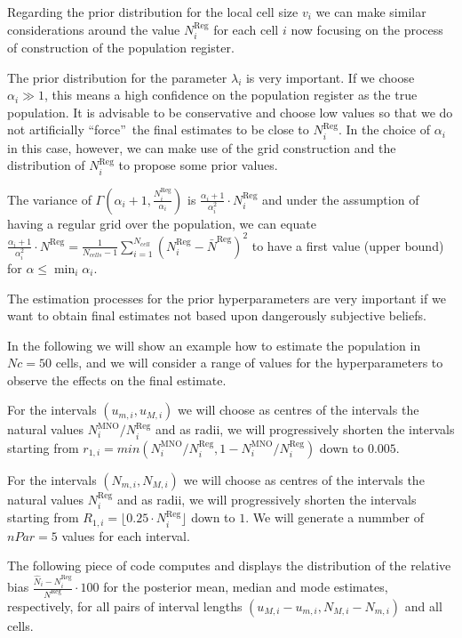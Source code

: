 \documentclass[12pt, a4paper]{article}
\begin{document}
Regarding the prior distribution for the local cell size $v_{i}$ we can make similar 
considerations around the value $N_{i}^{\textrm{Reg}}$ for each cell $i$ now focusing on the 
process of construction of the population register.

The prior distribution for the parameter $\lambda_{i}$ is very important. 
If we choose $\alpha_{i}\gg 1$, this means a high confidence on 
the population register as the true population. It is advisable to be conservative 
and choose low values so that we do not artificially  \textquotedblleft force\textquotedblright\ 
the final estimates to be close to $N_{i}^{\textrm{Reg}}$. In the choice of $\alpha_{i}$ in this case, 
however, we can make use of the grid construction and the distribution 
of $N_{i}^{\textrm{Reg}}$ to propose some prior values. 

The variance of $\Gamma(\alpha_{i} + 1, \frac{N^{\textrm{Reg}}_{i}}{\alpha_{i}})$ 
is $\frac{\alpha_{i} + 1}{\alpha_{i}^{2}}\cdot N^{\textrm{Reg}}_{i}$ and under the 
assumption of having a regular grid over the population, we can equate 
$\frac{\alpha_{i} + 1}{\alpha_{i}^{2}}\cdot N^{\textrm{Reg}}=\frac{1}{N_{cells} - 1}\sum_{i=1}^{N_{cell}}\left(N_{i}^{\textrm{Reg}} - \bar{N}^{\textrm{Reg}}\right)^{2}$
to have a first value (upper bound) for $\alpha\leq\min_{i}\alpha_{i}$. 

The estimation processes for the prior hyperparameters are very important if we want to obtain final estimates 
not based upon dangerously subjective beliefs.

In the following we will show an example how to estimate the population in $Nc=50$ cells, 
and we will consider a range of values for the hyperparameters to observe the effects on the final estimate.

For the intervals $(u_{m,i}, u_{M,i})$ we will choose as centres of the intervals the 
natural values $N^{\textrm{MNO}}_{i} / N^{\textrm{Reg}}_{i}$ and as radii, we will progressively 
shorten the intervals starting from $r_{1,i}=min(N^{\textrm{MNO}}_{i} / N^{\textrm{Reg}}_{i}, 1- N^{\textrm{MNO}}_{i} / N^{\textrm{Reg}}_{i})$ down to $0.005$.

For the intervals $(N_{m,i}, N_{M,i})$ we will choose as centres of the intervals the natural 
values $N^{\textrm{Reg}}_{i}$ and as radii, we will progressively shorten the intervals starting 
from $R_{1,i}=\lfloor 0.25\cdot N^{\textrm{Reg}}_{i}\rfloor$ down to $1$. We will generate a nummber
of $nPar=5$ values for each interval.

The following piece of code computes and displays the distribution of the relative 
bias $\frac{\hat{N}_{i}-N^{\textrm{Reg}}_{i}}{N^{\textrm{Reg}}} \cdot 100$ for the posterior mean, median and mode estimates, respectively, 
for all pairs of interval lengths $(u_{M,i}-u_{m,i}, N_{M,i} - N_{m,i})$ and all cells.
\end{document}
